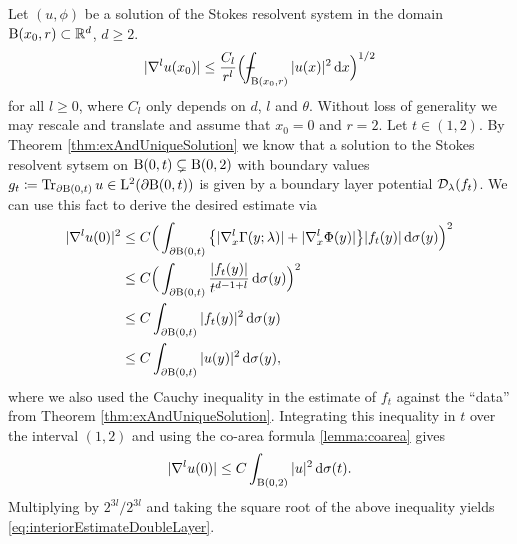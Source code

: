 \begin{rem}
  Let $(u,\phi)$ be a solution of the Stokes resolvent system in the domain $\mathrm{B}(x_0, r) \subset \mathbb{R}^d$, $d \geq 2$.
  \begin{align}
    \label{eq:interiorEstimateDoubleLayer}
    |\nabla^l u(x_0) | \leq \frac{C_l}{r^l} \Big( \dashint_{\BB(x_0, r)} |u(x)|^2 \d x \Big)^{1/2}
  \end{align}
  for all $l \geq 0$, where $C_l$ only depends on $d$, $l$ and $\theta$.
  Without loss of generality we may rescale and translate and assume that $x_0 = 0$ and $r = 2$.
  Let $t \in (1,2)$. By Theorem \ref{thm:exAndUniqueSolution} we know that a solution to the Stokes resolvent sytsem on $\mathrm{B}(0, t) \subsetneq \mathrm{B}(0,2)$ with boundary values $g_t \coloneqq \operatorname{Tr}_{\partial\mathrm{B}(0,t)} u \in \mathrm{L}^2(\partial\mathrm{B}(0,t))$ is given by a boundary layer potential $\mathcal{D}_\lambda(f_t)$.
  We can use this fact to derive the desired estimate via
  \begin{align*}
    |\nabla^l u(0)|^2 
    &\leq C \Big( \int_{\partial \mathrm{B}(0, t)} \big\{ |\nabla_x^l \Gamma(y; \lambda)|  + |\nabla_x^l \Phi(y) | \big\} |f_t(y)| \, {\operatorname{d}\!{\sigma}}(y)\Big)^2 \\
    &\leq  C \Big( \int_{\partial \mathrm{B}(0,t)} \frac{|f_t(y)|}{t^{d - 1 + l}}  \, {\operatorname{d}\!{\sigma}}(y)\Big)^2 \\
    &\leq  C \int_{\partial \mathrm{B}(0,t)} |f_t(y)|^2  \, {\operatorname{d}\!{\sigma}}(y) \\
    &\leq C \int_{\partial \mathrm{B}(0,t)} |u(y)|^2 \, {\operatorname{d}\!{\sigma}}(y), 
  \end{align*}
  where we also used the Cauchy inequality in the estimate of $f_t$ against the ``data'' from Theorem \ref{thm:exAndUniqueSolution}.
  Integrating this inequality in $t$ over the interval $(1,2)$ and using the co-area formula \ref{lemma:coarea} gives 
  \begin{align*}
    |\nabla^l u(0)| \leq C \int_{\mathrm{B}(0,2)} |u|^2 \, {\operatorname{d}\!{\sigma}}(t).
  \end{align*}
  Multiplying by ${2^{3l}}/{2^{3l}}$ and taking the square root of the above inequality yields \eqref{eq:interiorEstimateDoubleLayer}.
\end{rem}

